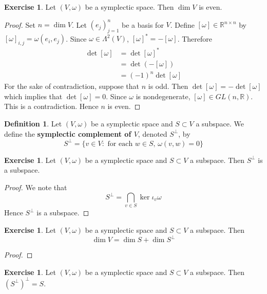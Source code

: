\documentclass{book}
\theoremstyle{definition}
\newtheorem{defn}[definition]{Definition}
\newtheorem{ex}[definition]{Exercise}
\newcommand{\om}{\omega}
\newcommand{\Lam}{\Lambda}
\newcommand{\R}{\mathbb{R}}
\DeclareMathOperator*{\0}{\mbf{0}}
\DeclareMathOperator*{\1}{\mbf{1}}
\newcommand{\tbf}[1]{\textbf{#1}}
\begin{document}
	
	\begin{ex}
		Let $(V, \om)$ be a symplectic space. Then $\dim V$ is even. 
	\end{ex}
	
	\begin{proof}
		Set $n = \dim V$. Let $(e_j)_{j=1}^n$ be a basis for $V$. Define $[\om] \in \R^{n \times n}$ by $[\om]_{i,j} = \om(e_i, e_j)$. Since $\om \in \Lam^2(V)$, $[\om]^* = - [\om]$. Therefore
		\begin{align*}
			\det[\om]
			& = \det [\om]^* \\
			& = \det (- [\om]) \\
			& = (-1)^{n} \det [\om] 
		\end{align*}
		For the sake of contradiction, suppose that $n$ is odd. Then $\det [\om] = - \det [\om]$ which implies that $\det [\om] = 0$. Since $\om$ is nondegenerate, $[\om] \in GL(n, \R)$. This is a contradiction. Hence $n$ is even. 
	\end{proof}
	
	\begin{defn}
		Let $(V, \om)$ be a symplectic space and $S \subset V$ a subspace. We define the \tbf{symplectic complement of $V$}, denoted $S^{\perp}$, by 
		$$S^{\perp} = \{v \in V: \text{ for each $w \in S$, $\om(v, w) = 0$}\}$$
	\end{defn}
	
	\begin{ex}
		Let $(V, \om)$ be a symplectic space and $S \subset V$ a subspace. Then $S^{\perp}$ is a subspace.
	\end{ex}
	
	\begin{proof}
		We note that 
		$$S^{\perp} = \bigcap_{v \in S} \ker \iota_v\om$$ 
		Hence $S^{\perp}$ is a subspace.
	\end{proof}
	
	
	\begin{ex}
		Let $(V, \om)$ be a symplectic space and $S \subset V$ a subspace. Then 
		$$\dim V = \dim S + \dim S^{\perp}$$ 
	\end{ex}
	
	\begin{proof}
		
	\end{proof}
	
	\begin{ex}
		Let $(V, \om)$ be a symplectic space and $S \subset V$ a subspace. Then $(S^{\perp})^{\perp} = S$. 
	\end{ex}
	
\end{document}
